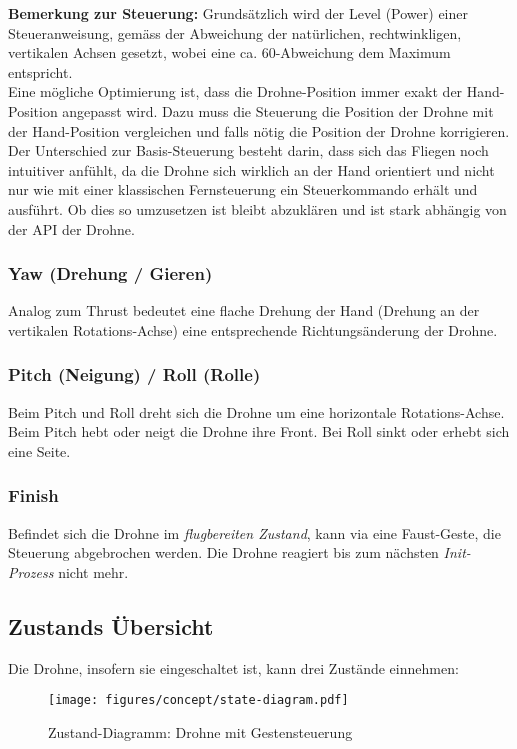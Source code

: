 \textbf{Bemerkung zur Steuerung:} Grundsätzlich wird der Level (Power) einer Steueranweisung, gemäss der Abweichung der natürlichen, rechtwinkligen, vertikalen Achsen gesetzt, wobei eine ca. 60\textdegree-Abweichung dem Maximum entspricht.\\
Eine mögliche Optimierung ist, dass die Drohne-Position immer exakt der Hand-Position angepasst wird.
Dazu muss die Steuerung die Position der Drohne mit der Hand-Position vergleichen und falls nötig die Position der Drohne korrigieren.
Der Unterschied zur Basis-Steuerung besteht darin, dass sich das Fliegen noch intuitiver anfühlt, da die Drohne sich wirklich an der Hand orientiert und nicht nur wie mit einer klassischen Fernsteuerung ein Steuerkommando erhält und ausführt.
Ob dies so umzusetzen ist bleibt abzuklären und ist stark abhängig von der API der Drohne.

\subsubsection{Yaw (Drehung / Gieren)}
Analog zum Thrust bedeutet eine flache Drehung der Hand (Drehung an der vertikalen Rotations-Achse) eine entsprechende Richtungsänderung der Drohne.

\subsubsection{Pitch (Neigung) / Roll (Rolle)}
Beim Pitch und Roll dreht sich die Drohne um eine horizontale Rotations-Achse. Beim Pitch hebt oder neigt die Drohne ihre Front. Bei Roll sinkt oder erhebt sich eine Seite.

\subsubsection{Finish}
Befindet sich die Drohne im \textit{flugbereiten Zustand}, kann via eine Faust-Geste, die Steuerung abgebrochen werden.
Die Drohne reagiert bis zum nächsten \textit{Init-Prozess} nicht mehr.


\subsection{Zustands Übersicht}
Die Drohne, insofern sie eingeschaltet ist, kann drei Zustände einnehmen:

\begin{figure}[H]
	\centering
	\texttt{[image: figures/concept/state-diagram.pdf]}
	\caption[Zustand-Diagramm: Drohne mit Gestensteuerung]{Zustand-Diagramm: Drohne mit Gestensteuerung}
\end{figure}

